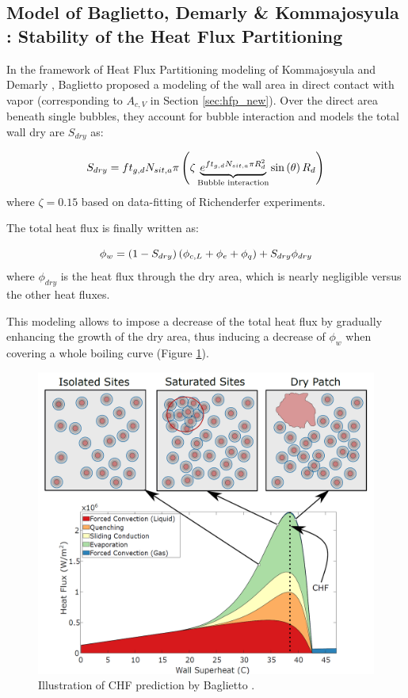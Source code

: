 \subsection{Model of Baglietto, Demarly \& Kommajosyula \cite{baglietto_boiling_2019} : Stability of the Heat Flux Partitioning}

In the framework of Heat Flux Partitioning modeling of Kommajosyula \cite{kommajosyula_development_2020} and Demarly \cite{demarly_new_2020}, Baglietto \etal \cite{baglietto_boiling_2019} proposed a modeling of the wall area in direct contact with vapor (corresponding to $A_{c,V}$ in Section \ref{sec:hfp_new}). Over the direct area beneath single bubbles, they account for bubble interaction and models the total wall dry are $S_{dry}$ as:

\begin{equation}
S_{dry} = ft_{g,d} N_{sit,a} \pi \left( \zeta \underbrace{ e^{f t_{g,d}N_{sit,a} \pi R_{d}^{2} } }_{\text{Bubble interaction}}  \mathrm{sin}\left( \theta \right) R_{d}  \right)
\end{equation} 
where $\zeta=0.15$ based on data-fitting of Richenderfer \cite{richenderfer_experimental_2018} experiments.

The total heat flux is finally written as:

\begin{equation}
\phi_{w}=\left( 1-S_{dry} \right)\left( \phi_{c,L} + \phi_{e} + \phi_{q} \right) + S_{dry} \phi_{dry}
\end{equation}
where $\phi_{dry}$ is the heat flux through the dry area, which is nearly negligible versus the other heat fluxes.

\npar

This modeling allows to impose a decrease of the total heat flux by gradually enhancing the growth of the dry area, thus inducing a decrease of $\phi_{w}$ when covering a whole boiling curve (Figure \ref{fig:chf_baglietto}).

\begin{figure}[!h]
\centering
\includegraphics[width=0.6\linewidth]{img/chf/chf_baglietto.png}
\caption{Illustration of CHF prediction by Baglietto \etal \cite{baglietto_boiling_2019}.}
\label{fig:chf_baglietto}
\end{figure}

